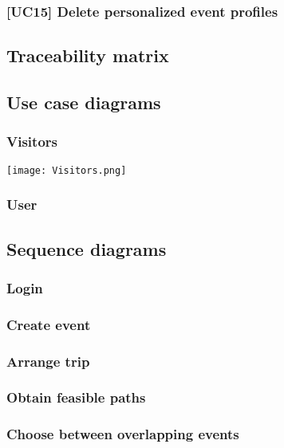 	\subsubsection{[UC15] Delete personalized event profiles}
		
		
\subsection{Traceability matrix}
\label{subsect: Traceability matrix}
	

\subsection{Use case diagrams}
\label{subsect:Use case diagrams}
	\subsubsection{Visitors}
		\texttt{[image: Visitors.png]}
	\subsubsection{User}
		\noindent{}
		
\subsection{Sequence diagrams}
\label{subsect:Sequence diagrams}
	\subsubsection{Login}
			\noindent{}
	\subsubsection{Create event}
		\noindent{}
	\subsubsection{Arrange trip}
		\noindent{}
	\subsubsection{Obtain feasible paths}
		\noindent{}
	\subsubsection{Choose between overlapping events}
		\noindent{}